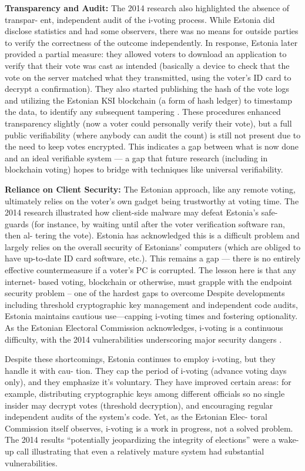 \documentclass[a4paper,10pt]{report}
\begin{document}
  \textbf  {Transparency and Audit:}   The 2014 research also highlighted the absence of transpar- ent, independent audit of the i-voting process.  While Estonia did disclose statistics and had some observers, there was no means for outside parties to verify the correctness of the outcome independently.  In response, Estonia later provided a partial measure: they allowed voters to download an application to verify that their vote was cast as intended (basically a device to check that the vote on the server matched what they transmitted, using the voter’s ID card to decrypt a confirmation).
 They also started publishing the hash of the vote logs and utilizing the Estonian KSI blockchain (a form of hash ledger) to timestamp the data, to identify any subsequent tampering \cite{mdpi_blockchain_voting}.   These procedures enhanced transparency slightly (now a voter could personally verify their vote), but a full public verifiability (where anybody can audit the count) is still not present due to the need to keep votes encrypted.  This indicates a gap between what is now done and an ideal verifiable system — a gap that future research (including in blockchain voting) hopes to bridge with techniques like universal verifiability.

  \textbf  {Reliance on Client Security:}   The Estonian approach, like any remote voting, ultimately relies on the voter’s own gadget being trustworthy at voting time.
 The 2014 research illustrated how client-side malware may defeat Estonia’s safe- guards (for instance, by waiting until after the voter verification software ran, then al- tering the vote).  Estonia has acknowledged this is a difficult problem and largely relies on the overall security of Estonians’ computers (which are obliged to have up-to-date ID card software, etc.).  This remains a gap — there is no entirely effective countermeasure if a voter’s PC is corrupted.  The lesson here is that any internet- based voting, blockchain or otherwise, must grapple with the endpoint security problem – one of the hardest gaps to overcome
  Despite developments including threshold cryptographic key management and independent code audits, Estonia maintains cautious use—capping i-voting times and fostering optionality.   As the Estonian Electoral Commission acknowledges, i-voting is a continuous difficulty, with the 2014 vulnerabilities underscoring major security dangers \cite{jhalderm_website}.

  Despite these shortcomings, Estonia continues to employ i-voting, but they handle it with cau- tion.  They cap the period of i-voting (advance voting days only), and they emphasize it’s voluntary.  They have improved certain areas: for example, distributing cryptographic keys among different officials so no single insider may decrypt votes (threshold decryption), and encouraging regular independent audits of the system’s code.  Yet, as the Estonian Elec- toral Commission itself observes, i-voting is a work in progress, not a solved problem.  The 2014 results “potentially jeopardizing the integrity of elections” \cite{jhalderm_website} were a wake-up call illustrating that even a relatively mature system had substantial vulnerabilities.
\end{document}
